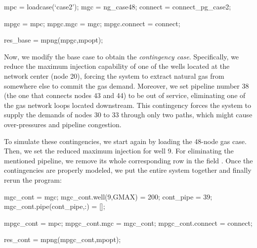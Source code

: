 \begin{Code}
mpc = loadcase(`case2');        %
mgc = ng_case48;                %
connect = connect_pg_case2;     %

mpgc = mpc;                     %
mpgc.mgc = mgc;                 %
mpgc.connect = connect;         %

res_base = mpng(mpgc,mpopt);         %
\end{Code}

Now, we modify the base case to obtain the \textit{contingency case}. Specifically, we reduce the maximum injection capability of one of the wells located at the network center (node 20), forcing the system to extract natural gas from somewhere else to commit the gas demand. Moreover, we set pipeline number 38 (the one that connects nodes 43 and 44) to be out of service, eliminating one of the gas network loops located downstream. This contingency forces the system to supply the demands of nodes 30 to 33 through only two paths, which might cause over-pressures and pipeline congestion. 

To simulate these contingencies, we start again by loading the 48-node gas case. Then, we set the reduced maximum injection for well 9. For eliminating the mentioned pipeline, we remove its whole corresponding row in the field . Once the contingencies are properly modeled, we put the entire system together and finally rerun the program:

\begin{Code}
mgc_cont = mgc;
mgc_cont.well(9,GMAX) = 200;        %
cont_pipe = 39; 		    %
mgc_cont.pipe(cont_pipe,:) = [];    %

mpgc_cont = mpc;                    %
mpgc_cont.mgc = mgc_cont;           %
mpgc_cont.connect = connect;	%

res_cont = mpng(mpgc_cont,mpopt);   %
\end{Code}

